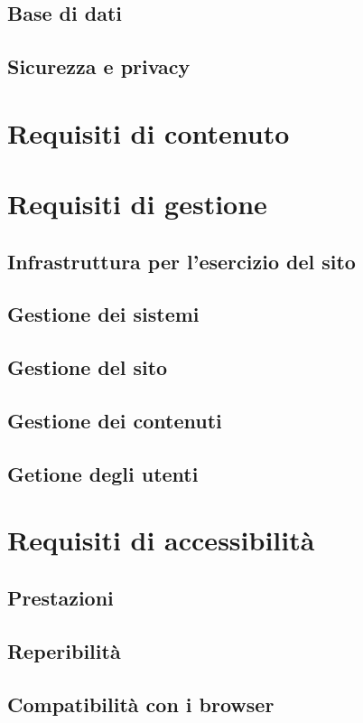 \documentclass[a4paper,12pt,hidelinks]{report}
\begin{document}
	\subsection{Base di dati}
	\subsection{Sicurezza e privacy}

\section{Requisiti di contenuto}

\section{Requisiti di gestione}
	\subsection{Infrastruttura per l'esercizio del sito}
	\subsection{Gestione dei sistemi}
	\subsection{Gestione del sito}
	\subsection{Gestione dei contenuti}
	\subsection{Getione degli utenti}

\section{Requisiti di accessibilità}
	\subsection{Prestazioni}
	\subsection{Reperibilità}
	\subsection{Compatibilità con i browser}
\end{document}
